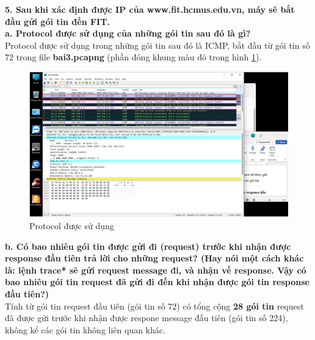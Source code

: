 \textbf{5.	Sau khi xác định được IP của www.fit.hcmus.edu.vn, máy sẽ bắt đầu gửi gói tin đến FIT.}\\
\textbf{a.	Protocol được sử dụng của những gói tin sau đó là gì?}\\
Protocol được sử dụng trong những gói tin sau đó là ICMP, bắt đầu từ gói tin số 72 trong file \textbf{bai3.pcapng} (phần đóng khung màu đỏ trong hình \ref{fig351}).

\begin{figure}[H]
\begin{center}
\includegraphics[scale=.8]{../figures/p3/p3_51}
\end{center}
\caption{Protocol được sử dụng}
\label{fig351}
\end{figure}

\textbf{b.	Có bao nhiêu gói tin được gửi đi (request) trước khi nhận được response đầu tiên trả lời cho những request? (Hay nói một cách khác là: lệnh trace* sẽ gửi request message đi, và nhận về response. Vậy có bao nhiêu gói tin request đã gửi đi đến khi nhận được gói tin response đầu tiên?)}\\
Tính từ gói tin request đầu tiên (gói tin số 72) có tổng cộng \textbf{28 gói tin} request đã được gửi trước khi nhận được respone message đầu tiên (gói tin số 224), không kể các gói tin không liên quan khác.

